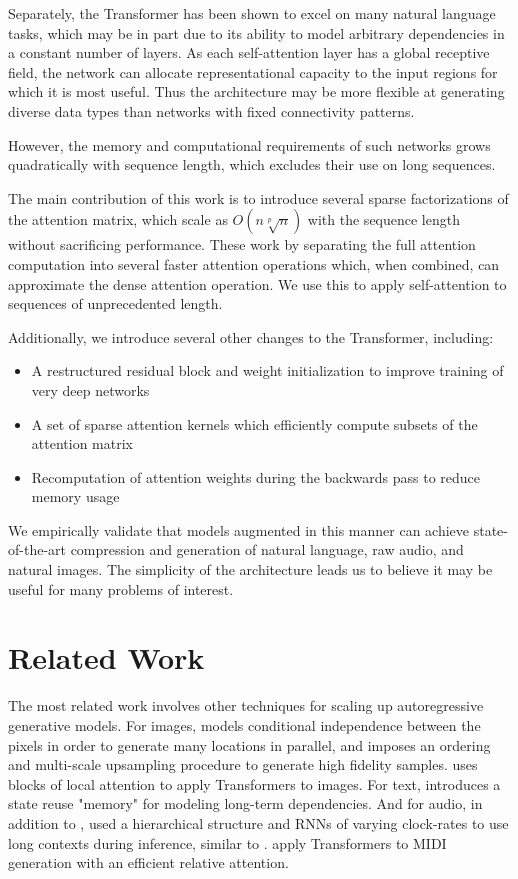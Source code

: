 Separately, the Transformer \cite{vaswani2017attention} has been shown to excel on many natural language tasks, which may be in part due to its ability to model arbitrary dependencies in a constant number of layers. As each self-attention layer has a global receptive field, the network can allocate representational capacity to the input regions for which it is most useful. Thus the architecture may be more flexible at generating diverse data types than networks with fixed connectivity patterns.

However, the memory and computational requirements of such networks grows quadratically with sequence length, which excludes their use on long sequences.

The main contribution of this work is to introduce several sparse factorizations of the attention matrix, which scale as $O(n \sqrt[p]{n})$ with the sequence length without sacrificing performance. These work by separating the full attention computation into several faster attention operations which, when combined, can approximate the dense attention operation. We use this to apply self-attention to sequences of unprecedented length.

Additionally, we introduce several other changes to the Transformer, including:

\begin{itemize}
  \item A restructured residual block and weight initialization to improve training of very deep networks \item A set of sparse attention kernels which efficiently compute subsets of the attention matrix \item Recomputation of attention weights during the backwards pass to reduce memory usage
\end{itemize}

We empirically validate that models augmented in this manner can achieve state-of-the-art compression and generation of natural language, raw audio, and natural images. The simplicity of the architecture leads us to believe it may be useful for many problems of interest.

\section{Related Work}

The most related work involves other techniques for scaling up autoregressive generative models. For images, \cite{reed2017parallel} models conditional independence between the pixels in order to generate many locations in parallel, and \cite{menick2018generating} imposes an ordering and multi-scale upsampling procedure to generate high fidelity samples. \cite{parmar2018image} uses blocks of local attention to apply Transformers to images.  For text, \cite{dai2018transformer} introduces a state reuse "memory" for modeling long-term dependencies. And for audio, in addition to \cite{van2016wavenet}, \cite{mehri2016samplernn} used a hierarchical structure and RNNs of varying clock-rates to use long contexts during inference, similar to \cite{koutnik2014clockwork}. \cite{huang2018improved} apply Transformers to MIDI generation with an efficient relative attention.

